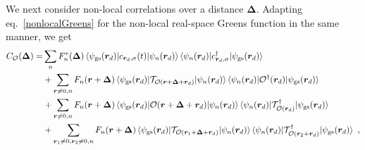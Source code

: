 We next consider non-local correlations over a distance \(\bm \Delta\). Adapting eq.~\ref{nonlocalGreens} for the non-local real-space Greens function in the same manner, we get
\begin{equation}\begin{aligned}
	C_{\mathcal{O}}(\bm \Delta) =& \sum_{n}F_n^*(\bm \Delta)\braket{\psi_\text{gs}({\bm r_d}) |  c_{{\bm r_d},\sigma}(t) | \psi_{n}(\bm r_d)} \braket{\psi_{n}(\bm r_d) | c^\dagger_{{\bm r_d},\sigma} | \psi_\text{gs}({\bm r_d})}\\
								&+ \sum_{\bm r \neq 0, n} F_n(\bm r + \bm \Delta)\braket{\psi_\text{gs}(\bm r_d) | \mathcal{T}_{\mathcal{O}(\bm r + \bm \Delta + \bm r_d)} | \psi_n(\bm r_d)} \braket{\psi_n(\bm r_d) | \mathcal{O}^\dagger(\bm r_d) | \psi_\text{gs}(\bm r_d)}\\
								&+ \sum_{\bm r \neq 0, n} F_n(\bm r + \bm \Delta)\braket{\psi_\text{gs}(\bm r_d) | \mathcal{O}(\bm r + \bm \Delta + \bm r_d) | \psi_n(\bm r_d)} \braket{\psi_n(\bm r_d) | \mathcal{T}^\dagger_{\mathcal{O}(\bm r_d)} | \psi_\text{gs}(\bm r_d)}\\
								&+ \sum_{\bm r_1 \neq 0, \bm r_2 \neq 0, n} F_n(\bm r + \bm \Delta)\braket{\psi_\text{gs}(\bm r_d) | \mathcal{T}_{\mathcal{O}(\bm r_1 + \bm \Delta + \bm r_d)} | \psi_n(\bm r_d)} \braket{\psi_n(\bm r_d) | \mathcal{T}^\dagger_{\mathcal{O}(\bm r_2 + \bm r_d)} | \psi_\text{gs}(\bm r_d)}~,
\end{aligned}\end{equation}

